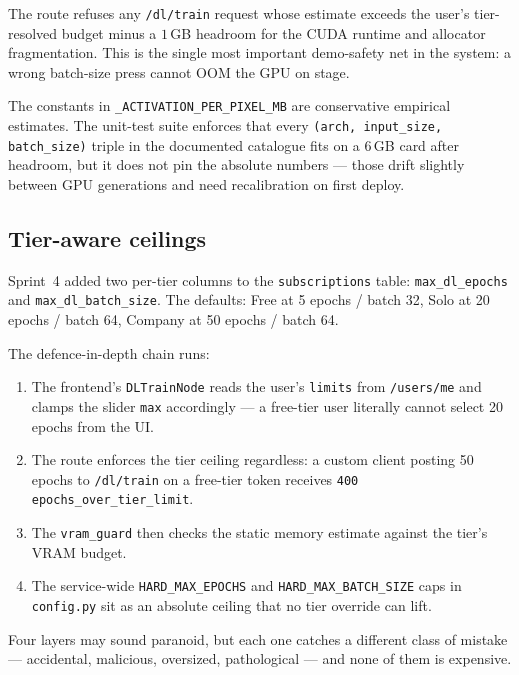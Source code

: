 \documentclass[12pt, a4paper, oneside]{report}
\begin{document}
The route refuses any \texttt{/dl/train} request whose estimate
exceeds the user's tier-resolved budget minus a $1$\,GB headroom for
the CUDA runtime and allocator fragmentation. This is the single
most important demo-safety net in the system: a wrong batch-size
press cannot OOM the GPU on stage.

The constants in \texttt{\_ACTIVATION\_PER\_PIXEL\_MB} are
conservative empirical estimates. The unit-test suite enforces that
every \texttt{(arch, input\_size, batch\_size)} triple in the
documented catalogue fits on a 6\,GB card after headroom, but it
does not pin the absolute numbers --- those drift slightly between
GPU generations and need recalibration on first deploy.

\subsection{Tier-aware ceilings}

Sprint~4 added two per-tier columns to the \texttt{subscriptions}
table: \texttt{max\_dl\_epochs} and \texttt{max\_dl\_batch\_size}.
The defaults: Free at 5 epochs / batch 32, Solo at 20 epochs / batch
64, Company at 50 epochs / batch 64.

The defence-in-depth chain runs:

\begin{enumerate}
    \item The frontend's \texttt{DLTrainNode} reads the user's
        \texttt{limits} from \texttt{/users/me} and clamps the
        slider \texttt{max} accordingly --- a free-tier user
        literally cannot select 20 epochs from the UI.
    \item The route enforces the tier ceiling regardless: a custom
        client posting 50 epochs to \texttt{/dl/train} on a
        free-tier token receives \texttt{400 epochs\_over\_tier\_limit}.
    \item The \texttt{vram\_guard} then checks the static memory
        estimate against the tier's VRAM budget.
    \item The service-wide \texttt{HARD\_MAX\_EPOCHS} and
        \texttt{HARD\_MAX\_BATCH\_SIZE} caps in \texttt{config.py}
        sit as an absolute ceiling that no tier override can lift.
\end{enumerate}

Four layers may sound paranoid, but each one catches a different
class of mistake --- accidental, malicious, oversized, pathological
--- and none of them is expensive.
\end{document}
